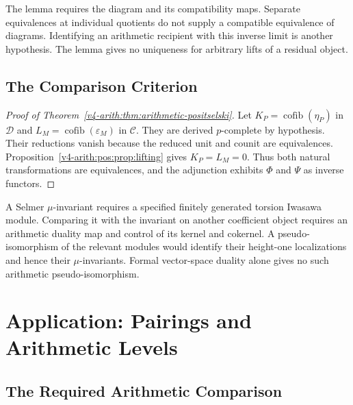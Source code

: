 The lemma requires the diagram and its compatibility maps.
Separate equivalences at individual quotients do not supply
a compatible equivalence of diagrams.
Identifying an arithmetic recipient with this inverse limit
is another hypothesis. The lemma gives no uniqueness for
arbitrary lifts of a residual object.

\subsection{The Comparison Criterion}
\label{v4-arith:pos:assembly}

\begin{proof}[Proof of Theorem~\ref{v4-arith:thm:arithmetic-positselski}]
Let \(K_P=\operatorname{cofib}(\eta_P)\) in \(\mathcal D\)
and \(L_M=\operatorname{cofib}(\varepsilon_M)\) in
\(\mathcal C\). They are derived \(p\)-complete by hypothesis.
Their reductions vanish because the reduced unit and counit
are equivalences. Proposition~\ref{v4-arith:pos:prop:lifting}
gives \(K_P=L_M=0\).
Thus both natural transformations are equivalences, and the
adjunction exhibits \(\Phi\) and \(\Psi\) as inverse functors.
\end{proof}

\begin{remark}
\label{v4-arith:pos:rem:dual-mu}
A Selmer \(\mu\)-invariant requires a specified finitely
generated torsion Iwasawa module.
Comparing it with the invariant on another coefficient object
requires an arithmetic duality map and control of its kernel
and cokernel. A pseudo-isomorphism of the relevant modules
would identify their height-one localizations and hence their
\(\mu\)-invariants. Formal vector-space duality alone gives
no such arithmetic pseudo-isomorphism.
\end{remark}

\section{Application: Pairings and Arithmetic Levels}
\label{v4-arith:pos:heisenberg-application}

\subsection{The Required Arithmetic Comparison}
\label{v4-arith:pos:step-3-residual}

